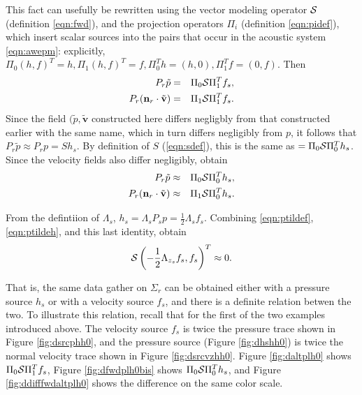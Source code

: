 \documentclass[georeport,12pt]{geophysics}
\newcommand{\bv}{\mathbf{v}}
\begin{document}
This fact can usefully be rewritten using the vector modeling
operator ${\cal S}$ (definition \ref{eqn:fwd}), and the projection
operators $\Pi_i$ (definition \ref{eqn:pidef}), which insert scalar
sources into the pairs that occur in the acoustic system
\ref{eqn:awepm}: explicitly, $\Pi_0(h,f)^T = h, \Pi_1(h,f)^T = f,
\Pi_0^Th = (h,0), \Pi_1^Tf = (0,f)$. Then
\begin{eqnarray}
  P_r\tilde{p} &=& \Pi_0 {\cal S} \Pi_1^Tf_s, \nonumber \\
  P_r({\bf n}_r \cdot \tilde{\bv}) &=& \Pi_1 {\cal S} \Pi_1^Tf_s.
                                       \label{eqn:ptildef}
\end{eqnarray}
Since the field $(\tilde{p},\tilde{\bv}$ constructed here differs negligbly from that
constructed earlier with the same name, which in turn differs negligibly from $p$, it
follows that $P_r\tilde{p} \approx P_rp = Sh_s$. By definition of $S$
(\ref{eqn:sdef}), this is the same as $=\Pi_0{\cal
  S}\Pi_0^Th_s$. Since the velocity fields also differ negligibly,
obtain
\begin{eqnarray}
  P_r\tilde{p} & \approx & \Pi_0 {\cal S} \Pi_0^Th_s, \nonumber \\
  P_r({\bf n}_r \cdot \tilde{\bv}) & \approx & \Pi_1 {\cal S} \Pi_0^Th_s.
                                       \label{eqn:ptildeh}
\end{eqnarray}

From the defintiion of $\Lambda_s$, $h_s=\Lambda_sP_sp =
\frac{1}{2}\Lambda_sf_s$. Combining \ref{eqn:ptildef},
\ref{eqn:ptildeh}, and this last identity, obtain
\begin{equation}
  \label{eqn:snull}
  {\cal S}\left(-\frac{1}{2}\Lambda_{z_s}f_s,f_s\right)^T \approx 0.
\end{equation}

That is, the same data gather on $\Sigma_r$ can be obtained either
with a pressure source $h_s$ or with a velocity source $f_s$, and
there is a definite relation betwen the two. To illustrate this
relation, recall that for the first of the two examples introduced
above. The velocity source $f_s$ is twice the pressure trace shown in
Figure \ref{fig:dsrcphh0}, and the pressure source (Figure \ref{fig:dhshh0}) is twice the normal
velocity trace shown in Figure \ref{fig:dsrcvzhh0}.
Figure \ref{fig:daltplh0} shows $\Pi_0{\cal S}\Pi_1^Tf_s$, Figure
\ref{fig:dfwdplh0bis} shows $\Pi_0{\cal S}\Pi_0^Th_s$, and Figure
\ref{fig:ddifffwdaltplh0} shows the difference on the same color scale.
\end{document}
